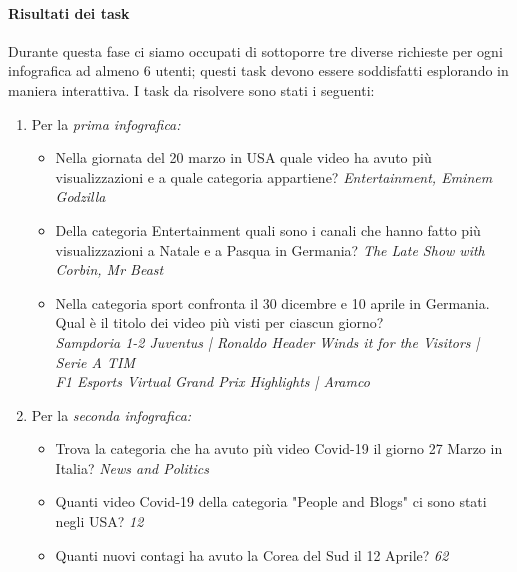\documentclass[10pt, a4paper,openany]{article}
\begin{document}
\paragraph{Risultati dei task} Durante questa fase ci siamo occupati di sottoporre tre diverse richieste per ogni infografica ad almeno 6 utenti; questi task devono essere soddisfatti esplorando in maniera interattiva. I task da risolvere sono stati i seguenti:
\begin{enumerate}
	\item Per la \textit{prima infografica:}
	\begin{itemize}
		\item Nella giornata del 20 marzo in USA quale video ha avuto più visualizzazioni e a quale categoria appartiene?  \textit{Entertainment, Eminem Godzilla}
		\item Della categoria Entertainment quali sono i canali che hanno fatto più visualizzazioni a Natale e a Pasqua in Germania? \textit{The Late Show with Corbin, Mr Beast}
		\item Nella categoria sport confronta il 30 dicembre e 10 aprile in Germania. Qual è il titolo dei video più visti per ciascun giorno?\\
		\textit{Sampdoria 1-2 Juventus | Ronaldo Header Winds it for the Visitors | Serie A TIM \\ F1 Esports Virtual Grand Prix Highlights | Aramco}
	\end{itemize}
	\item Per la \textit{seconda infografica:}
\begin{itemize}
	\item Trova la categoria che ha avuto più video Covid-19 il giorno 27 Marzo in Italia? \textit{News and Politics}
	\item Quanti video Covid-19 della categoria "People and Blogs" ci sono stati negli USA? \textit{12}
	\item Quanti nuovi contagi ha avuto la Corea del Sud il 12 Aprile? \textit{62}
\end{itemize}
\end{enumerate}
\end{document}
